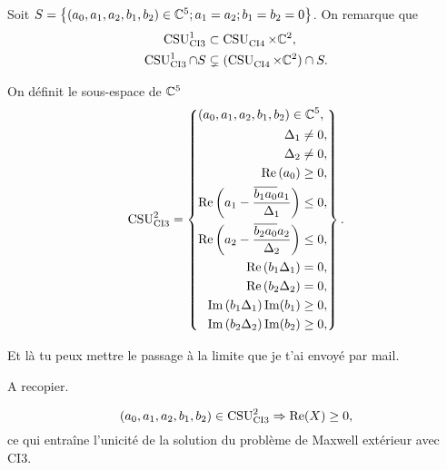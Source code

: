   Soit \(S = \left\lbrace (a_0,a_1,a_2,b_1,b_2) \in \CC^5 ; a_1 = a_2 ; b_1 = b_2 = 0 \right\rbrace \). On remarque que
  \begin{align}
    \CSU[1]{CI3} & \subset \CSU{CI4}\times\CC^2,
    \\
    \CSU[1]{CI3}\cap S & \subsetneq (\CSU{CI4}\times\CC^2)\cap S.
  \end{align}

  \begin{defn}
    \label{def:csu:ci3-2}

    On définit le sous-espace de \(\CC^5\)
    \begin{equation*}
      \CSU[2]{CI3} = \left\lbrace 
      \begin{aligned}
      &(a_0,a_1,a_2,b_1,b_2) \in \CC^5,
      \\
      &\begin{aligned}
        \Delta_1 &\not = 0,
        \\
        \Delta_2 &\not = 0,
        \\
        \Re\left(a_0\right)&\ge 0,
        \\
        \Re\left(a_1 - \frac{\conj{b_1a_0}a_1}{\Delta_1}\right) &\le 0,
        \\
        \Re\left(a_2 - \frac{\conj{b_2a_0}a_2}{\Delta_2}\right) &\le 0,
        \\
        \Re\left(b_1\Delta_1\right) &= 0,
        \\
        \Re\left(b_2\Delta_2\right) &= 0,
        \\
        \Im\left(b_1\Delta_1\right)\Im(b_1)&\ge 0,
        \\
        \Im\left(b_2\Delta_2\right)\Im(b_2)&\ge 0,
        \end{aligned}
      \end{aligned}
      \right\rbrace.
    \end{equation*}
  \end{defn}
  \begin{REM}
    Et là tu peux mettre le passage à la limite que je t'ai envoyé par mail.
  \end{REM}
  \begin{REP}
  A recopier.
  \end{REP}

 \begin{prop}
    \label{prop:csu:ci3-2}
    \begin{equation*}
      (a_0,a_1,a_2,b_1,b_2) \in \CSU[2]{CI3} \Rightarrow \Re(X) \ge 0,
    \end{equation*}
    ce qui entraîne l'unicité de la solution du problème de Maxwell extérieur avec CI3.
  \end{prop}

